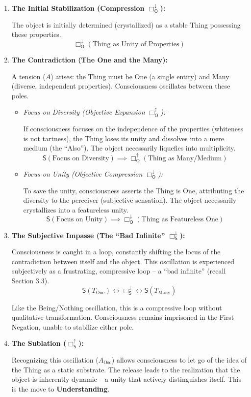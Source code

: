 \documentclass[12pt]{book}
\newcommand{\SBoxUp}{\Box_{\mathsf{S}}^{\uparrow}}
\newcommand{\SBoxDown}{\Box_{\mathsf{S}}^{\downarrow}}
\newcommand{\OBoxUp}{\Box_{\mathsf{O}}^{\uparrow}}
\newcommand{\OBoxDown}{\Box_{\mathsf{O}}^{\downarrow}}
\begin{document}
\begin{enumerate}
\item \textbf{The Initial Stabilization (Compression $\OBoxDown$):}

The object is initially determined (crystallized) as a stable Thing possessing these properties.
\[
\OBoxDown(\text{Thing as Unity of Properties})
\]

\item \textbf{The Contradiction (The One and the Many):}

A tension ($A$) arises: the Thing must be One (a single entity) and Many (diverse, independent properties). Consciousness oscillates between these poles.

\begin{itemize}
\item \textit{Focus on Diversity (Objective Expansion $\OBoxUp$):}

If consciousness focuses on the independence of the properties (whiteness is not tartness), the Thing loses its unity and dissolves into a mere medium (the ``Also''). The object necessarily liquefies into multiplicity.
\[
\mathsf{S}(\text{Focus on Diversity}) \implies \OBoxUp(\text{Thing as Many/Medium})
\]

\item \textit{Focus on Unity (Objective Compression $\OBoxDown$):}

To save the unity, consciousness asserts the Thing is One, attributing the diversity to the perceiver (subjective sensation). The object necessarily crystallizes into a featureless unity.
\[
\mathsf{S}(\text{Focus on Unity}) \implies \OBoxDown(\text{Thing as Featureless One})
\]
\end{itemize}

\item \textbf{The Subjective Impasse (The ``Bad Infinite'' $\SBoxDown$):}

Consciousness is caught in a loop, constantly shifting the locus of the contradiction between itself and the object. This oscillation is experienced subjectively as a frustrating, compressive loop -- a ``bad infinite'' (recall Section 3.3).
\[
\mathsf{S}(T_{\text{One}}) \leftrightarrow \SBoxDown \leftrightarrow \mathsf{S}(T_{\text{Many}})
\]

Like the Being/Nothing oscillation, this is a compressive loop without qualitative transformation. Consciousness remains imprisoned in the First Negation, unable to stabilize either pole.

\item \textbf{The Sublation ($\SBoxUp$):}

Recognizing this oscillation ($A_{\mathrm{Osc}}$) allows consciousness to let go of the idea of the Thing as a static substrate. The release leads to the realization that the object is inherently dynamic -- a unity that actively distinguishes itself. This is the move to \textbf{Understanding}.
\end{enumerate}
\end{document}
